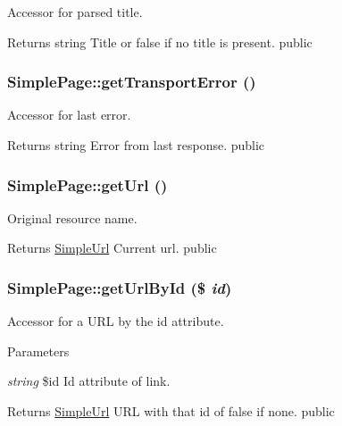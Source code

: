 \label{class_simple_page_a8cee582bd07bdc14ba5f9246e6600f2c}
Accessor for parsed title. \begin{DoxyReturn}{Returns}
string Title or false if no title is present.  public 
\end{DoxyReturn}
\hypertarget{class_simple_page_a2b66dc0883ae668bdcdbdf438fe5c852}{
\subsubsection[{getTransportError}]{\setlength{\rightskip}{0pt plus 5cm}SimplePage::getTransportError ()}}
\label{class_simple_page_a2b66dc0883ae668bdcdbdf438fe5c852}
Accessor for last error. \begin{DoxyReturn}{Returns}
string Error from last response.  public 
\end{DoxyReturn}
\hypertarget{class_simple_page_a380e54b3460541ec7d84d200b06cdd66}{
\subsubsection[{getUrl}]{\setlength{\rightskip}{0pt plus 5cm}SimplePage::getUrl ()}}
\label{class_simple_page_a380e54b3460541ec7d84d200b06cdd66}
Original resource name. \begin{DoxyReturn}{Returns}
\hyperlink{class_simple_url}{SimpleUrl} Current url.  public 
\end{DoxyReturn}
\hypertarget{class_simple_page_a9989f73f4a3242fba33104b073cd8949}{
\subsubsection[{getUrlById}]{\setlength{\rightskip}{0pt plus 5cm}SimplePage::getUrlById (\$ {\em id})}}
\label{class_simple_page_a9989f73f4a3242fba33104b073cd8949}
Accessor for a URL by the id attribute. 
\begin{DoxyParams}{Parameters}
\item[{\em string}]\$id Id attribute of link. \end{DoxyParams}
\begin{DoxyReturn}{Returns}
\hyperlink{class_simple_url}{SimpleUrl} URL with that id of false if none.  public 
\end{DoxyReturn}

